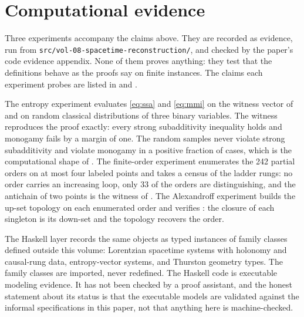 \documentclass[11pt,letterpaper]{article}
\theoremstyle{definition}
\theoremstyle{remark}
\begin{document}
\section{Computational evidence}

Three experiments accompany the claims above. They are recorded as evidence, run from \texttt{src/vol-08-spacetime-reconstruction/}, and checked by the paper's code evidence appendix. None of them proves anything: they test that the definitions behave as the proofs say on finite instances. The claims each experiment probes are listed in  and .

The entropy experiment evaluates \eqref{eq:ssa} and \eqref{eq:mmi} on the witness vector of  and on random classical distributions of three binary variables. The witness reproduces the proof exactly: every strong subadditivity inequality holds and monogamy fails by a margin of one. The random samples never violate strong subadditivity and violate monogamy in a positive fraction of cases, which is the computational shape of . The finite-order experiment enumerates the 242 partial orders on at most four labeled points and takes a census of the ladder rungs: no order carries an increasing loop, only 33 of the orders are distinguishing, and the antichain of two points is the witness of . The Alexandroff experiment builds the up-set topology on each enumerated order and verifies : the closure of each singleton is its down-set and the topology recovers the order.

The Haskell layer records the same objects as typed instances of family classes defined outside this volume: Lorentzian spacetime systems with holonomy and causal-rung data, entropy-vector systems, and Thurston geometry types. The family classes are imported, never redefined. The Haskell code is executable modeling evidence. It has not been checked by a proof assistant, and the honest statement about its status is that the executable models are validated against the informal specifications in this paper, not that anything here is machine-checked.
\end{document}
